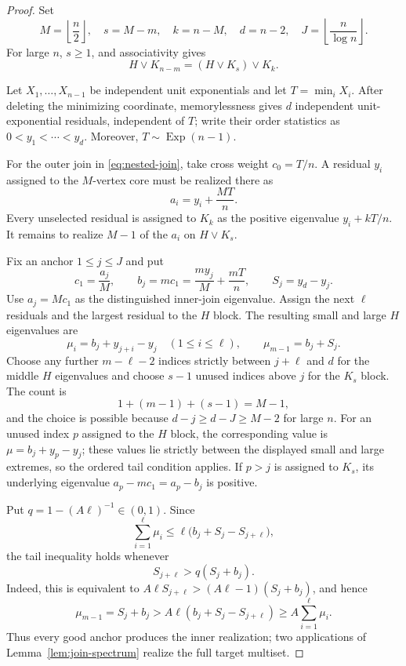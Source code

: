 \documentclass[11pt,reqno]{amsart}
\theoremstyle{definition}
\theoremstyle{remark}
\begin{document}
\begin{proof}
Set
\[
  M=\left\lfloor\frac n2\right\rfloor,
  \quad s=M-m,
  \quad k=n-M,
  \quad d=n-2,
  \quad J=\left\lfloor\frac n{\log n}\right\rfloor.
\]
For large $n$, $s\ge1$, and associativity gives
\begin{equation}\label{eq:nested-join}
  H\vee K_{n-m}=(H\vee K_s)\vee K_k.
\end{equation}

Let $X_1,\ldots,X_{n-1}$ be independent unit exponentials and let
$T=\min_iX_i$.  After deleting the minimizing coordinate, memorylessness
gives $d$ independent unit-exponential residuals, independent of $T$; write
their order statistics as $0<y_1<\cdots<y_d$.  Moreover,
$T\sim\operatorname{Exp}(n-1)$.

For the outer join in \eqref{eq:nested-join}, take cross weight $c_0=T/n$.
A residual $y_i$ assigned to the $M$-vertex core must be realized there as
\[
  a_i=y_i+\frac{MT}{n}.
\]
Every unselected residual is assigned to $K_k$ as the positive eigenvalue
$y_i+kT/n$.  It remains to realize $M-1$ of the $a_i$ on $H\vee K_s$.

Fix an anchor $1\le j\le J$ and put
\[
  c_1=\frac{a_j}{M},\qquad
  b_j=mc_1=\frac{my_j}{M}+\frac{mT}{n},\qquad
  S_j=y_d-y_j.
\]
Use $a_j=Mc_1$ as the distinguished inner-join eigenvalue.  Assign the next
$\ell$ residuals and the largest residual to the $H$ block.  The resulting
small and large $H$ eigenvalues are
\begin{equation}\label{eq:H-anchor-eigenvalues}
  \mu_i=b_j+y_{j+i}-y_j\quad(1\le i\le\ell),
  \qquad \mu_{m-1}=b_j+S_j.
\end{equation}
Choose any further $m-\ell-2$ indices strictly between $j+\ell$ and $d$
for the middle $H$ eigenvalues and choose $s-1$ unused indices above $j$ for
the $K_s$ block.  The count is
\[
  1+(m-1)+(s-1)=M-1,
\]
and the choice is possible because $d-j\ge d-J\ge M-2$ for large $n$.
For an unused index $p$ assigned to the $H$ block, the corresponding value is
$\mu=b_j+y_p-y_j$; these values lie strictly between the displayed small and
large extremes, so the ordered tail condition applies.
If $p>j$ is assigned to $K_s$, its underlying eigenvalue
$a_p-mc_1=a_p-b_j$ is positive.

Put $q=1-(A\ell)^{-1}\in(0,1)$.  Since
\[
  \sum_{i=1}^{\ell}\mu_i
  \le\ell\bigl(b_j+S_j-S_{j+\ell}\bigr),
\]
the tail inequality holds whenever
\begin{equation}\label{eq:good-anchor}
  S_{j+\ell}>q(S_j+b_j).
\end{equation}
Indeed, this is equivalent to
$A\ell S_{j+\ell}>(A\ell-1)(S_j+b_j)$, and hence
\[
  \mu_{m-1}=S_j+b_j
  >A\ell(b_j+S_j-S_{j+\ell})
  \ge A\sum_{i=1}^{\ell}\mu_i.
\]
Thus every good anchor produces the inner realization; two applications of
Lemma~\ref{lem:join-spectrum} realize the full target multiset.


\end{proof}
\end{document}
